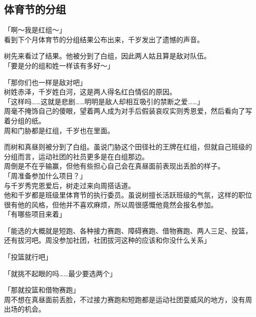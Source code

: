 \subsection{体育节的分组}

「啊～我是红组～」\\

看到下个月体育节的分组结果公布出来，千岁发出了遗憾的声音。

树先来看过了结果。他被分到了白组，因此两人姑且算是敌对队伍。\\

「要是分的组和姓一样该有多好～」

「那你们也一样是敌对吧」\\

树姓赤泽，千岁姓白河，这是两人得名红白情侣的原因。\\

「这样吗……这就是悲剧……明明是敌人却相互吸引的禁断之爱……」\\

周毫不掩饰自己的傻眼，望着两人成为对手后假装哀叹实则秀恩爱，然后看向了写着分组的纸。\\

周和门胁都是红组，千岁也在里面。

而树和真昼则被分到了白组。虽说门胁这个田径社的王牌在红组，但就自己班级的分组而言，运动社团的社员更多是在白组那边。\\

周倒是不在乎输赢，但他有些担心自己会在真昼面前表现出丢脸的样子。\\

「周准备参加什么项目？」\\

与千岁秀完恩爱后，树走过来向周搭话道。\\

他和千岁都是班级里体育节的执行委员。虽说树擅长活跃班级的气氛，这样的职位很有他的风格，但他并不喜欢麻烦，所以周很感慨他竟然会报名参加。\\

「有哪些项目来着」

「能选的大概就是短跑、各种接力赛跑、障碍赛跑、借物赛跑、两人三足、投篮，还有拔河吧。周没参加社团，社团拔河这种的应该和你没什么关系」

「投篮就行吧」

「就挑不起眼的吗……最少要选两个」

「那就投篮和借物赛跑」\\

周不想在真昼面前丢脸，不过接力赛跑和短跑都是运动社团耍威风的地方，没有周出场的机会。

